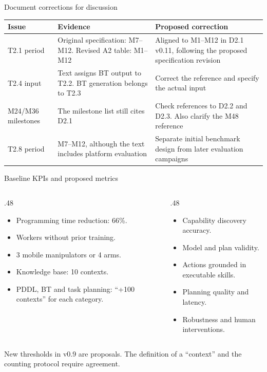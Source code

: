 \documentclass[aspectratio=169,11pt]{beamer}
\begin{document}
\begin{frame}{Document corrections for discussion}
\small\renewcommand{\arraystretch}{1.35}
\begin{tabularx}{\textwidth}{@{}p{}XX@{}}
\toprule
Issue & Evidence & Proposed correction\\\midrule
T2.1 period & Original specification: M7--M12. Revised A2 table: M1--M12 & Aligned to M1--M12 in D2.1 v0.11, following the proposed specification revision\\
T2.4 input & Text assigns BT output to T2.2. BT generation belongs to T2.3 & Correct the reference and specify the actual input\\
M24/M36 milestones & The milestone list still cites D2.1 & Check references to D2.2 and D2.3. Also clarify the M48 reference\\
T2.8 period & M7--M12, although the text includes platform evaluation & Separate initial benchmark design from later evaluation campaigns\\\bottomrule
\end{tabularx}
\end{frame}

\begin{frame}{Baseline KPIs and proposed metrics}
\begin{columns}[T]
\begin{column}{.48\textwidth}
\begin{itemize}\items
\item Programming time reduction: 66\%.
\item Workers without prior training.
\item 3 mobile manipulators or 4 arms.
\item Knowledge base: 10 contexts.
\item PDDL, BT and task planning: ``+100 contexts'' for each category.
\end{itemize}
\end{column}
\begin{column}{.48\textwidth}
\begin{itemize}\items
\item Capability discovery accuracy.
\item Model and plan validity.
\item Actions grounded in executable skills.
\item Planning quality and latency.
\item Robustness and human interventions.
\end{itemize}
\end{column}
\end{columns}
\medskip\small New thresholds in v0.9 are proposals. The definition of a ``context'' and the counting protocol require agreement.
\end{frame}
\end{document}
